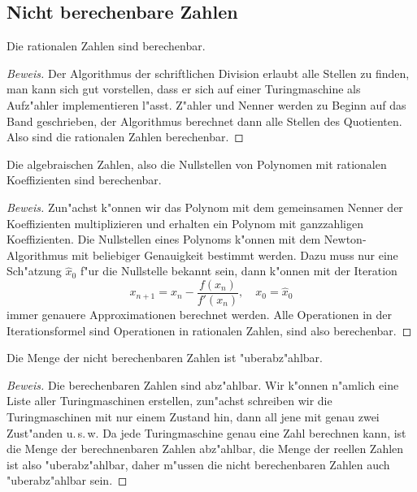 \subsection{Nicht berechenbare Zahlen}

\begin{satz}
Die rationalen Zahlen sind berechenbar.
\end{satz}

\begin{proof}[Beweis]
Der Algorithmus der schriftlichen Division erlaubt alle Stellen
zu finden, man kann sich gut vorstellen, dass er sich auf einer
Turingmaschine als Aufz"ahler implementieren l"asst. Z"ahler und
Nenner werden zu Beginn auf das Band geschrieben, der Algorithmus
berechnet dann alle Stellen des Quotienten. Also sind die rationalen
Zahlen berechenbar.
\end{proof}

\begin{satz}Die algebraischen Zahlen, also die Nullstellen von
Polynomen mit rationalen Koeffizienten sind berechenbar.
\end{satz}

\begin{proof}[Beweis]
Zun"achst k"onnen wir das Polynom mit dem gemeinsamen Nenner der
Koeffizienten multiplizieren und erhalten ein Polynom mit ganzzahligen
Koeffizienten.
Die Nullstellen eines Polynoms k"onnen mit dem Newton-Algorithmus
mit beliebiger Genauigkeit bestimmt werden. Dazu muss nur eine 
Sch"atzung $\hat x_0$ f"ur die Nullstelle bekannt sein, dann k"onnen
mit der Iteration
\[
x_{n+1}=x_n-\frac{f(x_n)}{f'(x_n)},\quad x_0 = \hat x_0
\]
immer genauere Approximationen berechnet werden. Alle Operationen
in der Iterationsformel sind Operationen in rationalen Zahlen, sind
also berechenbar.
\end{proof}

\begin{satz}
Die Menge der nicht berechenbaren Zahlen ist "uberabz"ahlbar.
\end{satz}

\begin{proof}[Beweis]
Die berechenbaren Zahlen sind abz"ahlbar. Wir k"onnen n"amlich
eine Liste aller Turingmaschinen erstellen, zun"achst schreiben
wir die Turingmaschinen mit nur einem Zustand hin, dann all jene
mit genau zwei Zust"anden u.\,s.\,w. Da jede Turingmaschine genau eine
Zahl berechnen kann, ist die Menge der berechnenbaren Zahlen abz"ahlbar,
die Menge der reellen Zahlen ist also "uberabz"ahlbar, daher m"ussen die
nicht berechenbaren Zahlen auch "uberabz"ahlbar sein.
\end{proof}

